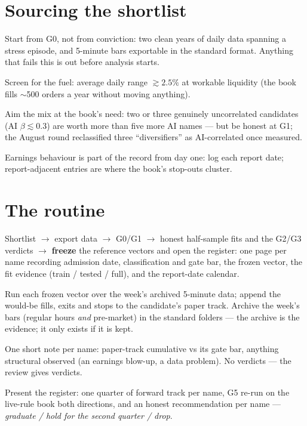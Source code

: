 \documentclass[11pt,a4paper]{article}
\begin{document}
\section{Sourcing the shortlist}

\begin{checklist}
\item Start from G0, not from conviction: two clean years of daily data
      spanning a stress episode, and 5-minute bars exportable in the standard
      format. Anything that fails this is out before analysis starts.
\item Screen for the fuel: average daily range $\gtrsim 2.5\%$ at workable
      liquidity (the book fills $\sim$500 orders a year without moving
      anything).
\item Aim the mix at the book's need: two or three genuinely uncorrelated
      candidates (AI $\beta \lesssim 0.3$) are worth more than five more AI
      names --- but be honest at G1; the August round reclassified three
      ``diversifiers'' as AI-correlated once measured.
\item Earnings behaviour is part of the record from day one: log each report
      date; report-adjacent entries are where the book's stop-outs cluster.
\end{checklist}

\section{The routine}

\begin{description}[leftmargin=1.9em, itemsep=3pt]
\item[Now (weeks 1--3).] Shortlist $\to$ export data $\to$ G0/G1 $\to$ honest
half-sample fits and the G2/G3 verdicts $\to$ \textbf{freeze} the reference
vectors and open the register: one page per name recording admission date,
classification and gate bar, the frozen vector, the fit evidence
(train / tested / full), and the report-date calendar.
\item[Every Sunday.] Run each frozen vector over the week's archived 5-minute
data; append the would-be fills, exits and stops to the candidate's paper
track. Archive the week's bars (regular hours \emph{and} pre-market) in the
standard folders --- the archive is the evidence; it only exists if it is
kept.
\item[Monthly.] One short note per name: paper-track cumulative vs its gate
bar, anything structural observed (an earnings blow-up, a data problem).
No verdicts --- the review gives verdicts.
\item[December review.] Present the register: one quarter of forward track
per name, G5 re-run on the live-rule book both directions, and an honest
recommendation per name --- \emph{graduate / hold for the second quarter /
drop}.
\end{description}
\end{document}
